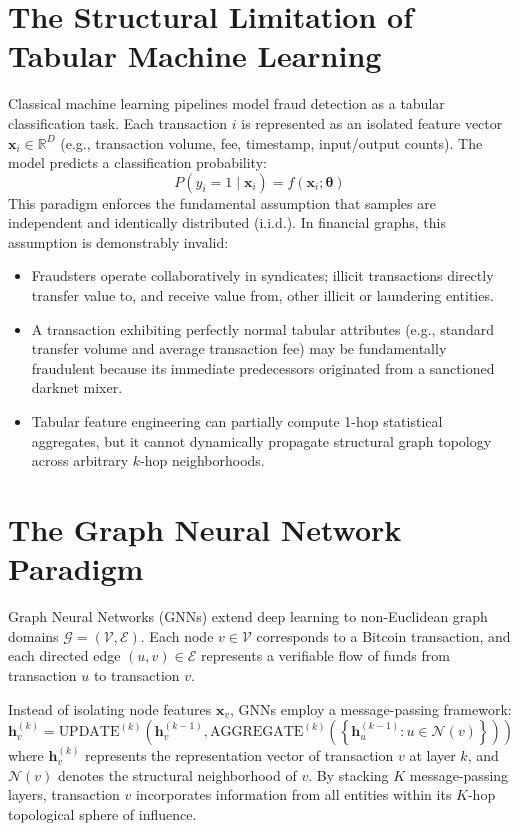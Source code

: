 \documentclass[11pt,a4paper]{report}
\begin{document}
\section{The Structural Limitation of Tabular Machine Learning}
Classical machine learning pipelines model fraud detection as a tabular classification task. Each transaction $i$ is represented as an isolated feature vector $\mathbf{x}_i \in \mathbb{R}^D$ (e.g., transaction volume, fee, timestamp, input/output counts). The model predicts a classification probability:
\[
P(y_i = 1 \mid \mathbf{x}_i) = f(\mathbf{x}_i; \boldsymbol{\theta})
\]
This paradigm enforces the fundamental assumption that samples are independent and identically distributed (i.i.d.). In financial graphs, this assumption is demonstrably invalid:
\begin{itemize}[leftmargin=1.5em]
  \item Fraudsters operate collaboratively in syndicates; illicit transactions directly transfer value to, and receive value from, other illicit or laundering entities.
  \item A transaction exhibiting perfectly normal tabular attributes (e.g., standard transfer volume and average transaction fee) may be fundamentally fraudulent because its immediate predecessors originated from a sanctioned darknet mixer.
  \item Tabular feature engineering can partially compute 1-hop statistical aggregates, but it cannot dynamically propagate structural graph topology across arbitrary $k$-hop neighborhoods.
\end{itemize}

\section{The Graph Neural Network Paradigm}
Graph Neural Networks (GNNs) extend deep learning to non-Euclidean graph domains $\mathcal{G} = (\mathcal{V}, \mathcal{E})$. Each node $v \in \mathcal{V}$ corresponds to a Bitcoin transaction, and each directed edge $(u, v) \in \mathcal{E}$ represents a verifiable flow of funds from transaction $u$ to transaction $v$. 

Instead of isolating node features $\mathbf{x}_v$, GNNs employ a message-passing framework:
\[
\mathbf{h}_v^{(k)} = \text{UPDATE}^{(k)} \left( \mathbf{h}_v^{(k-1)}, \text{AGGREGATE}^{(k)} \left( \left\{ \mathbf{h}_u^{(k-1)} : u \in \mathcal{N}(v) \right\} \right) \right)
\]
where $\mathbf{h}_v^{(k)}$ represents the representation vector of transaction $v$ at layer $k$, and $\mathcal{N}(v)$ denotes the structural neighborhood of $v$. By stacking $K$ message-passing layers, transaction $v$ incorporates information from all entities within its $K$-hop topological sphere of influence.
\end{document}
